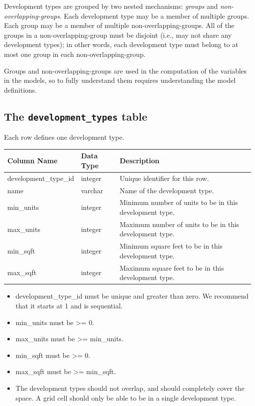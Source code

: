 Development types are grouped by two nested mechanisms: \emph{groups} and
\emph{non-overlapping-groups}. Each development type may be a member of
multiple groups. Each group may be a member of multiple
non-overlapping-groups. All of the groups in a non-overlapping-group must be
disjoint (i.e., may not share any development types); in other words, each
development type must belong to at most one group in each
non-overlapping-group.

Groups and non-overlapping-groups are used in the computation of the variables
in the models, so to fully understand them requires understanding the model 
definitions.

\subsection{The {\tt development_types} table}

Each row defines one development type.

\begin{tabular}{|l|l|l|}

\hline
\textbf{Column Name} & \textbf{Data Type} & \textbf{Description} \\

\hline development_type_id & integer & Unique identifier for this row.  \\

\hline name & varchar & Name of the development type.  \\

\hline min_units & integer & Minimum number of units to be in this development
type.  \\

\hline max_units & integer & Maximum number of units to be in this development
type.  \\

\hline min_sqft & integer & Minimum square feet to be in this development type.
\\

\hline max_sqft & integer & Maximum square feet to be in this development type.
\\

\hline

\end{tabular}

\begin{itemize}
\tight
\item development_type_id must be unique and greater than zero. We recommend that it starts at 1 and is sequential.
\item min_units must be \textgreater{}= 0.
\item max_units must be \textgreater{}= min_units.
\item min_sqft must be \textgreater{}= 0.
\item max_sqft must be \textgreater{}= min_sqft.
\item The development types should not overlap, and should completely cover the
space.  A grid cell should only be able to be in a single development type.
\end{itemize}

